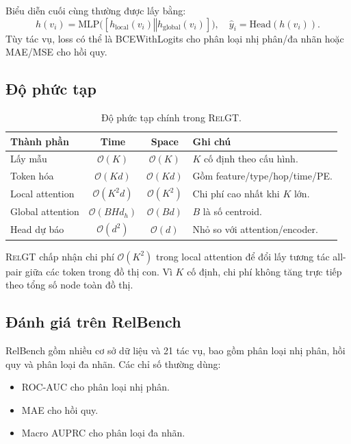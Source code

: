 \documentclass[12pt,a4paper]{article}
\newcommand{\RelGT}{\textsc{RelGT}}
\newcommand{\concat}{\mathbin{\Vert}}
\begin{document}
Biểu diễn cuối cùng thường được lấy bằng:
\[
  h(v_i)=\text{MLP}\bigl([h_\text{local}(v_i)\concat h_\text{global}(v_i)]\bigr),
\quad
  \hat{y}_i=\text{Head}(h(v_i)).
\]
Tùy tác vụ, loss có thể là BCEWithLogits cho phân loại nhị phân/đa nhãn hoặc
MAE/MSE cho hồi quy.

\subsection{Độ phức tạp}

\begin{table}[H]
\centering
\caption{Độ phức tạp chính trong \RelGT{}.}
\begin{tabularx}{\textwidth}{lccX}
\toprule
\textbf{Thành phần} & \textbf{Time} & \textbf{Space} & \textbf{Ghi chú} \\
\midrule
Lấy mẫu & $\mathcal{O}(K)$ & $\mathcal{O}(K)$ & $K$ cố định theo cấu hình. \\
Token hóa & $\mathcal{O}(Kd)$ & $\mathcal{O}(Kd)$ & Gồm feature/type/hop/time/PE. \\
Local attention & $\mathcal{O}(K^2d)$ & $\mathcal{O}(K^2)$ & Chi phí cao nhất khi $K$ lớn. \\
Global attention & $\mathcal{O}(BHd_h)$ & $\mathcal{O}(B d)$ & $B$ là số centroid. \\
Head dự báo & $\mathcal{O}(d^2)$ & $\mathcal{O}(d)$ & Nhỏ so với attention/encoder. \\
\bottomrule
\end{tabularx}
\end{table}

\begin{insightbox}
\RelGT{} chấp nhận chi phí $\mathcal{O}(K^2)$ trong local attention để đổi
lấy tương tác all-pair giữa các token trong đồ thị con. Vì $K$ cố định, chi
phí không tăng trực tiếp theo tổng số node toàn đồ thị.
\end{insightbox}

\subsection{Đánh giá trên RelBench}

RelBench gồm nhiều cơ sở dữ liệu và 21 tác vụ, bao gồm phân loại nhị phân,
hồi quy và phân loại đa nhãn. Các chỉ số thường dùng:
\begin{itemize}
  \item ROC-AUC cho phân loại nhị phân.
  \item MAE cho hồi quy.
  \item Macro AUPRC cho phân loại đa nhãn.
\end{itemize}
\end{document}
